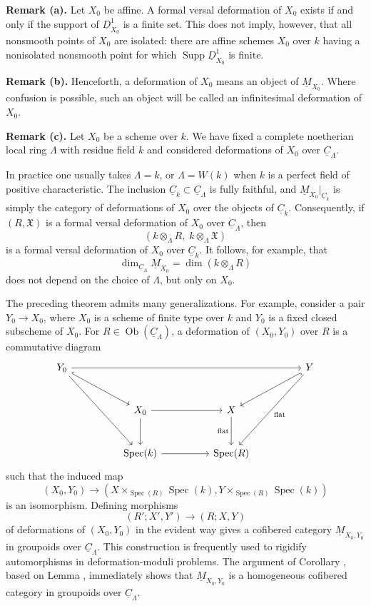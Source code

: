 
\medskip
\noindent\textbf{Remark (a).}
Let $X_0$ be affine. A formal versal deformation of $X_0$ exists if
and only if the support of $\underline D^1_{X_0}$ is a finite set.
This does not imply, however, that all nonsmooth points of $X_0$ are
isolated: there are affine schemes $X_0$ over $k$ having a
nonisolated nonsmooth point for which
$\operatorname{Supp}\underline D^1_{X_0}$ is finite.

\medskip
\noindent\textbf{Remark (b).}
Henceforth, a deformation of $X_0$ means an object of
$\underline M_{X_0}$. Where confusion is possible, such an object
will be called an infinitesimal deformation of $X_0$.

\medskip
\noindent\textbf{Remark (c).}
Let $X_0$ be a scheme over $k$. We have fixed a complete noetherian
local ring $\Lambda$ with residue field $k$ and considered
deformations of $X_0$ over $\underline C_\Lambda$.


In practice one usually takes $\Lambda=k$, or $\Lambda=W(k)$ when
$k$ is a perfect field of positive characteristic. The inclusion
$\underline C_k\subset\underline C_\Lambda$ is fully faithful, and
$\underline M_{X_0}|_{\underline C_k}$ is simply the category of
deformations of $X_0$ over the objects of $\underline C_k$.
Consequently, if $(R,\mathfrak X)$ is a formal versal deformation of
$X_0$ over $\underline C_\Lambda$, then
\[
 (k\otimes_\Lambda R,\;k\otimes_\Lambda\mathfrak X)
\]
is a formal versal deformation of $X_0$ over $\underline C_k$. It
follows, for example, that
\[
 \dim_{\underline C_\Lambda}\underline M_{X_0}
 =\dim(k\otimes_\Lambda R)
\]
does not depend on the choice of $\Lambda$, but only on $X_0$.

The preceding theorem admits many generalizations. For example,
consider a pair $Y_0\longrightarrow X_0$, where $X_0$ is a scheme of
finite type over $k$ and $Y_0$ is a fixed closed subscheme of $X_0$.
For $R\in\operatorname{Ob}(\underline C_\Lambda)$, a deformation of
$(X_0,Y_0)$ over $R$ is a commutative diagram
\[
\begin{tikzcd}[row sep=large,column sep=huge]
Y_0 \arrow[rrr] \arrow[dr,hook] \arrow[ddr]
&&& Y \arrow[dl,hook] \arrow[ddl,"\mathrm{flat}"] \\
& X_0 \arrow[r] \arrow[d]
& X \arrow[d,"\mathrm{flat}"'] & \\
& \operatorname{Spec}(k) \arrow[r]
& \operatorname{Spec}(R) &
\end{tikzcd}
\]
such that the induced map
\[
(X_0,Y_0)\longrightarrow
\left(
 X\times_{\operatorname{Spec}(R)}\operatorname{Spec}(k),
 Y\times_{\operatorname{Spec}(R)}\operatorname{Spec}(k)
\right)
\]
is an isomorphism. Defining morphisms
\[
(R';X',Y')\longrightarrow(R;X,Y)
\]
of deformations of $(X_0,Y_0)$ in the evident way gives a cofibered
category $\underline M_{X_0,Y_0}$ in groupoids over
$\underline C_\Lambda$. This construction is frequently used to
rigidify automorphisms in deformation-moduli problems. The argument
of Corollary , based on Lemma , immediately shows that
$\underline M_{X_0,Y_0}$ is a homogeneous cofibered category in
groupoids over $\underline C_\Lambda$.
